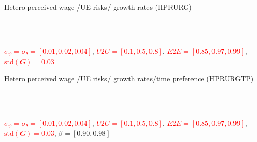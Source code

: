 \documentclass{beamer}
\begin{document}
\begin{frame}{Hetero perceived wage /UE risks/ growth rates (HPRURG)}
	\label{StE_dist_compare_HPRURG}
	
	\begin{figure}[!ht]
		\begin{center}
			 \\
			 \\
		\end{center}
	\end{figure}
	{\scriptsize\textcolor{red}{$\sigma_\psi = \sigma_\theta = [0.01,0.02,0.04]$}, \textcolor{red}{$U2U=[0.1,0.5,0.8]$}, \textcolor{red}{$E2E = [0.85, 0.97, 0.99]$}, \textcolor{red}{$\text{std}(G) = 0.03$}} 
\end{frame}


		

\begin{frame}{Hetero perceived wage /UE risks/ growth rates/time preference (HPRURGTP)}
	\label{StE_dist_compare_HPRURGUHTP}
	\begin{figure}[!ht]
	\begin{center}
		 \\
		 \\
	\end{center}
\end{figure}
{\scriptsize\textcolor{red}{$\sigma_\psi = \sigma_\theta = [0.01,0.02,0.04]$}, \textcolor{red}{$U2U=[0.1,0.5,0.8]$}, \textcolor{red}{$E2E = [0.85, 0.97, 0.99]$}, \textcolor{red}{$\text{std}(G) = 0.03$}, $\beta = [0.90, 0.98]$} 
\end{frame}
\end{document}

